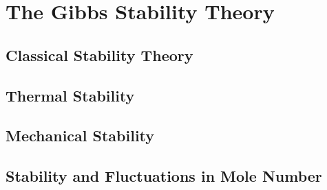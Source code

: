 \chapter{The Gibbs Stability Theory}
\section{Classical Stability Theory}
\section{Thermal Stability}
\section{Mechanical Stability}
\section{Stability and Fluctuations in Mole Number}
